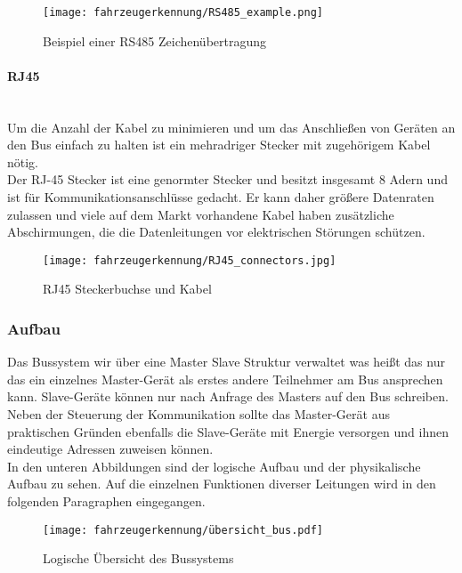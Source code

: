 \begin{figure}[H]
    \centering
    \texttt{[image: fahrzeugerkennung/RS485\_example.png]}
    \caption{Beispiel einer RS485 Zeichenübertragung}
\end{figure}

\paragraph{RJ45}\mbox{}\\
Um die Anzahl der Kabel zu minimieren und um das Anschließen von Geräten an den Bus einfach zu halten ist ein
mehradriger Stecker mit zugehörigem Kabel nötig.\\
Der RJ-45 Stecker ist eine genormter Stecker und besitzt insgesamt 8 Adern und ist für Kommunikationsanschlüsse gedacht. Er kann daher größere Datenraten zulassen und viele auf dem
Markt vorhandene Kabel haben zusätzliche Abschirmungen, die die Datenleitungen vor elektrischen Störungen schützen. 

\begin{figure}[H]
    \centering
    \texttt{[image: fahrzeugerkennung/RJ45\_connectors.jpg]}
    \caption{RJ45 Steckerbuchse und Kabel}
\end{figure}



\subsubsection{Aufbau}

Das Bussystem wir über eine Master Slave Struktur verwaltet was heißt das nur das ein einzelnes Master-Gerät als erstes andere Teilnehmer am Bus ansprechen kann.
Slave-Geräte können nur nach Anfrage des Masters auf den Bus schreiben. Neben der Steuerung der Kommunikation sollte das Master-Gerät aus praktischen Gründen ebenfalls die Slave-Geräte
mit Energie versorgen und ihnen eindeutige Adressen zuweisen können. \\

In den unteren Abbildungen sind der logische Aufbau und der physikalische Aufbau zu sehen.
Auf die einzelnen Funktionen diverser Leitungen wird in den folgenden Paragraphen eingegangen.

\begin{figure}[H]
    \centering
    \texttt{[image: fahrzeugerkennung/übersicht\_bus.pdf]}
    \caption{Logische Übersicht des Bussystems}
\end{figure}

